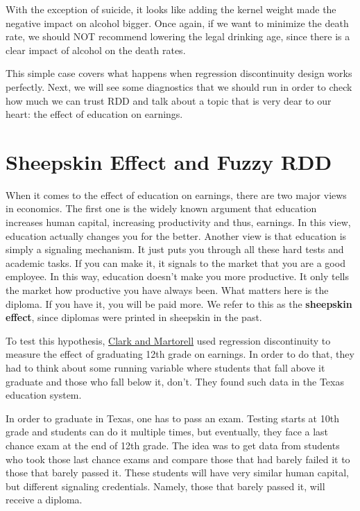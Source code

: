 \documentclass[
  letterpaper,
  DIV=11,
  numbers=noendperiod]{scrreprt}
\begin{document}
With the exception of suicide, it looks like adding the kernel weight
made the negative impact on alcohol bigger. Once again, if we want to
minimize the death rate, we should NOT recommend lowering the legal
drinking age, since there is a clear impact of alcohol on the death
rates.

This simple case covers what happens when regression discontinuity
design works perfectly. Next, we will see some diagnostics that we
should run in order to check how much we can trust RDD and talk about a
topic that is very dear to our heart: the effect of education on
earnings.

\hypertarget{sheepskin-effect-and-fuzzy-rdd}{%
\section{Sheepskin Effect and Fuzzy
RDD}\label{sheepskin-effect-and-fuzzy-rdd}}

When it comes to the effect of education on earnings, there are two
major views in economics. The first one is the widely known argument
that education increases human capital, increasing productivity and
thus, earnings. In this view, education actually changes you for the
better. Another view is that education is simply a signaling mechanism.
It just puts you through all these hard tests and academic tasks. If you
can make it, it signals to the market that you are a good employee. In
this way, education doesn't make you more productive. It only tells the
market how productive you have always been. What matters here is the
diploma. If you have it, you will be paid more. We refer to this as the
\textbf{sheepskin effect}, since diplomas were printed in sheepskin in
the past.

To test this hypothesis,
\href{https://faculty.smu.edu/millimet/classes/eco7321/papers/clark\%20martorell\%202014.pdf}{Clark
and Martorell} used regression discontinuity to measure the effect of
graduating 12th grade on earnings. In order to do that, they had to
think about some running variable where students that fall above it
graduate and those who fall below it, don't. They found such data in the
Texas education system.

In order to graduate in Texas, one has to pass an exam. Testing starts
at 10th grade and students can do it multiple times, but eventually,
they face a last chance exam at the end of 12th grade. The idea was to
get data from students who took those last chance exams and compare
those that had barely failed it to those that barely passed it. These
students will have very similar human capital, but different signaling
credentials. Namely, those that barely passed it, will receive a
diploma.
\end{document}
